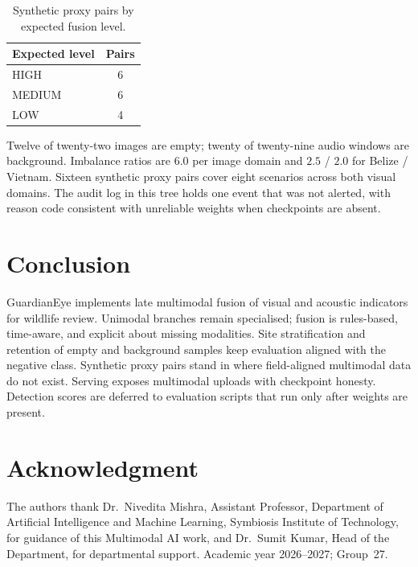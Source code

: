 \documentclass[conference]{IEEEtran}
\begin{document}
\begin{table}[t]
\caption{Synthetic proxy pairs by expected fusion level.}
\label{tab:proxy}
\centering
\begin{tabular}{@{}lc@{}}
\toprule
Expected level & Pairs \\
\midrule
HIGH & 6 \\
MEDIUM & 6 \\
LOW & 4 \\
\bottomrule
\end{tabular}
\end{table}

Twelve of twenty-two images are empty; twenty of twenty-nine audio windows are background. Imbalance ratios are $6.0$ per image domain and $2.5$ / $2.0$ for Belize / Vietnam. Sixteen synthetic proxy pairs cover eight scenarios across both visual domains. The audit log in this tree holds one event that was not alerted, with reason code consistent with unreliable weights when checkpoints are absent.

\section{Conclusion}
GuardianEye implements late multimodal fusion of visual and acoustic indicators for wildlife review. Unimodal branches remain specialised; fusion is rules-based, time-aware, and explicit about missing modalities. Site stratification and retention of empty and background samples keep evaluation aligned with the negative class. Synthetic proxy pairs stand in where field-aligned multimodal data do not exist. Serving exposes multimodal uploads with checkpoint honesty. Detection scores are deferred to evaluation scripts that run only after weights are present.

\section*{Acknowledgment}
The authors thank Dr.~Nivedita Mishra, Assistant Professor, Department of Artificial Intelligence and Machine Learning, Symbiosis Institute of Technology, for guidance of this Multimodal AI work, and Dr.~Sumit Kumar, Head of the Department, for departmental support. Academic year 2026--2027; Group~27.
\end{document}
